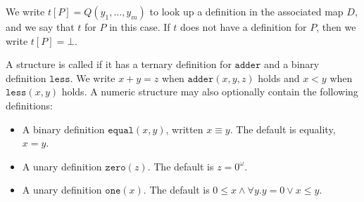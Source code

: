 We write $t[P] = Q(y_1, \ldots, y_m)$ to look up a definition in the associated map $D$, and we say that $t$  for $P$ in this case.
If $t$ does not have a definition for $P$, then we write $t[P] = \bot$.

\begin{definition}
    A structure is called  if it has a ternary definition for $\texttt{adder}$ and a binary definition $\texttt{less}$.
    We write $x + y = z$ when $\texttt{adder}(x, y, z)$ holds and $x < y$ when $\texttt{less}(x, y)$ holds.
    A numeric structure may also optionally contain the following definitions:
    \begin{itemize}
        \item A binary definition $\texttt{equal}(x,y)$, written $x \equiv y$.
            The default is equality, $x = y$.
        
        \item A unary definition $\texttt{zero}(z)$.
            The default is $z = 0^{\omega}$.
            
        \item A unary definition $\texttt{one}(x)$.
            The default is $0 \leq x \land \forall y. y = 0 \lor x \leq y$.
    \end{itemize}
\end{definition}


